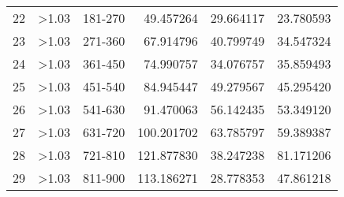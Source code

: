 \begin{tabular}{lllrrr}
22 &      >1.03 &  181-270 &   49.457264 &  29.664117 &  23.780593 \\
23 &      >1.03 &  271-360 &   67.914796 &  40.799749 &  34.547324 \\
24 &      >1.03 &  361-450 &   74.990757 &  34.076757 &  35.859493 \\
25 &      >1.03 &  451-540 &   84.945447 &  49.279567 &  45.295420 \\
26 &      >1.03 &  541-630 &   91.470063 &  56.142435 &  53.349120 \\
27 &      >1.03 &  631-720 &  100.201702 &  63.785797 &  59.389387 \\
28 &      >1.03 &  721-810 &  121.877830 &  38.247238 &  81.171206 \\
29 &      >1.03 &  811-900 &  113.186271 &  28.778353 &  47.861218 \\
\bottomrule
\end{tabular}
